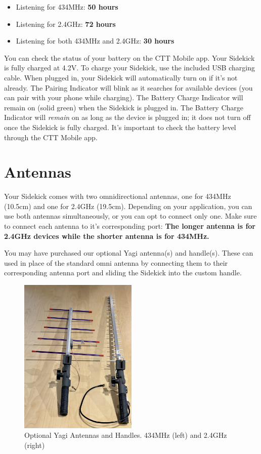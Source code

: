 \documentclass[
]{article}
\providecommand{\tightlist}{%
  \setlength{\itemsep}{0pt}\setlength{\parskip}{0pt}}
\begin{document}
\begin{itemize}
\tightlist
\item
  Listening for 434MHz: \textbf{50 hours}
\item
  Listening for 2.4GHz: \textbf{72 hours}
\item
  Listening for both 434MHz and 2.4GHz: \textbf{30 hours}
\end{itemize}

You can check the status of your battery on the CTT Mobile app. Your
Sidekick is fully charged at 4.2V. To charge your Sidekick, use the
included USB charging cable. When plugged in, your Sidekick will
automatically turn on if it's not already. The Pairing Indicator will
blink as it searches for available devices (you can pair with your phone
while charging). The Battery Charge Indicator will remain on (solid
green) when the Sidekick is plugged in. The Battery Charge Indicator
will \emph{remain} on as long as the device is plugged in; it does not
turn off once the Sidekick is fully charged. It's important to check the
battery level through the CTT Mobile app.

\hypertarget{antennas}{%
\section{Antennas}\label{antennas}}

Your Sidekick comes with two omnidirectional antennas, one for 434MHz
(10.5cm) and one for 2.4GHz (19.5cm). Depending on your application, you
can use both antennas simultaneously, or you can opt to connect only
one. Make sure to connect each antenna to it's corresponding port:
\textbf{The longer antenna is for 2.4GHz devices while the shorter
antenna is for 434MHz.}

You may have purchased our optional Yagi antenna(s) and handle(s). These
can used in place of the standard omni antenna by connecting them to
their corresponding antenna port and sliding the Sidekick into the
custom handle.

\begin{figure}
\hypertarget{id}{%
\centering
\includegraphics[width=0.5\textwidth,height=\textheight]{./images/sidekick_yagiAntennas.JPG}
\caption{Optional Yagi Antennas and Handles. 434MHz (left) and 2.4GHz
(right)}\label{id}
}
\end{figure}
\end{document}
